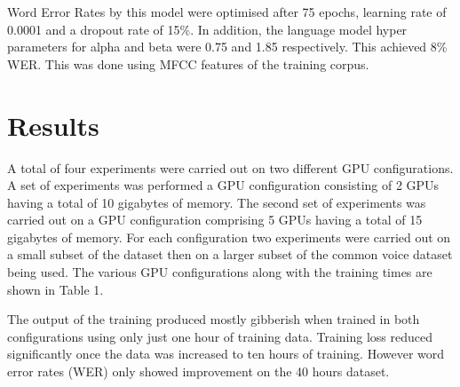 Word Error Rates by this model were optimised after 75 epochs, learning rate of 0.0001 and a dropout rate of 15\%.  In addition, the language model hyper parameters for alpha and beta were 0.75 and 1.85 respectively.  This achieved 8\% WER. This was done using MFCC features of the training corpus.


\section{Results}
A total of four experiments were carried out on two different GPU configurations. A set of experiments was performed a GPU configuration consisting of 2 GPUs having a total of 10 gigabytes of memory. The second set of experiments was carried out on a GPU configuration comprising 5 GPUs having a total of 15 gigabytes of memory.  For each configuration two experiments were carried out on a small subset of the dataset then on a larger subset of the common voice dataset being used.   The various GPU configurations along with the training times are shown in Table 1.

The output of the training produced mostly gibberish when trained in both configurations using only just one hour of training data.  Training loss reduced significantly once the data was increased to ten hours of training.  However word error rates (WER) only showed improvement on the 40 hours dataset.

